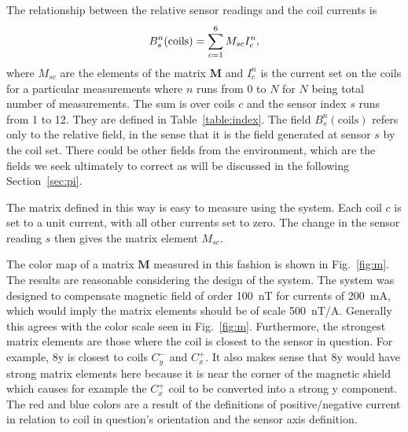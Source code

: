 The relationship between the relative sensor readings and the coil currents is
\begin{equation}\label{eq:B_coils}
    B_s^n(\mathrm{coils})=\sum_{c=1}^{6} M_{sc} I_c^n{\rm ,}
\end{equation}
where $M_{sc}$ are the elements of the matrix $\bm{M}$ and $I_c^n$ is the current set on the coils for a particular measurements where $n$ runs from 0 to $N$ for $N$ being total number of measurements. The sum is over coils $c$ and the sensor index $s$ runs from 1 to 12. They are defined in Table~\ref{table:index}. The field $B_s^n(\mathrm{coils})$ refers only to the relative field, in the sense that it is the field generated at sensor $s$ by the coil set. There could be other fields from the environment, which are the fields we seek ultimately to correct as will be discussed in the following Section~\ref{sec:pi}.






The matrix defined in this way is easy to measure using the system.  Each coil $c$ is set to a unit current, with all other currents set to zero.  The change in the sensor reading $s$ then gives the matrix element $M_{sc}$. 



The color map of a matrix $\bm{M}$ measured in this fashion is shown in Fig.~\ref{fig:m}.  The results are reasonable considering the design of the system.  The system was designed to compensate magnetic field of order 100~nT for currents of 200~mA, which would imply the matrix elements should be of scale 500~nT/A.  Generally this agrees with the color scale seen in Fig.~\ref{fig:m}.  Furthermore, the strongest matrix elements are those where the coil is closest to the sensor in question.  For example, 8y is closest to coils $C_y^-$ and $C_x^+$.  It also makes sense that 8y would have strong matrix elements here because it is near the corner of the magnetic shield which causes for example the $C_x^+$ coil to be converted into a strong y component.  The red and blue colors are a result of the definitions of positive/negative current in relation to coil in question's orientation and the sensor axis definition.



